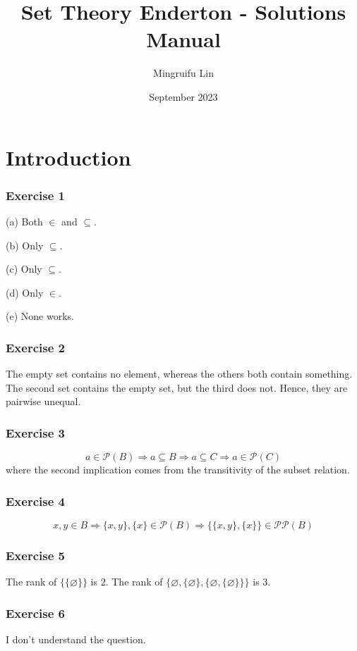 \documentclass{book}
\title{Set Theory Enderton - Solutions Manual}
\author{Mingruifu Lin}
\date{September 2023}
\begin{document}
\maketitle

\tableofcontents

\chapter{Introduction}

\subsection*{Exercise 1}
(a)
Both $\in$ and $\subseteq$.

\noindent
(b)
Only $\subseteq$.

\noindent
(c)
Only $\subseteq$.

\noindent
(d)
Only $\in$.

\noindent
(e)
None works.

\subsection*{Exercise 2}
The empty set contains no element, whereas the others both contain something. The second set contains the empty set, but the third does not. Hence, they are pairwise unequal.

\subsection*{Exercise 3}
$$a \in \mathcal{P}(B) \Rightarrow a \subseteq B \Rightarrow a \subseteq C \Rightarrow a \in \mathcal{P}(C)$$
where the second implication comes from the transitivity of the subset relation.

\subsection*{Exercise 4}
$$x, y \in B \Rightarrow \{x, y\}, \{x\} \in \mathcal{P} (B) \Rightarrow \{ \{x, y\}, \{x\} \} \in \mathcal{P}\mathcal{P}(B)$$

\subsection*{Exercise 5}
The rank of $\{\{\varnothing\}\}$ is 2. The rank of $\{\varnothing, \{\varnothing\}, \{\varnothing, \{\varnothing\}\}\}$ is 3.

\subsection*{Exercise 6}
I don't understand the question.
\end{document}
